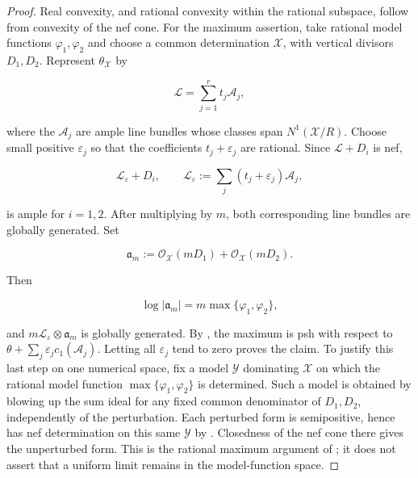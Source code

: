 \begin{proof}
Real convexity, and rational convexity within the rational subspace,
follow from convexity of the nef cone.  For the maximum assertion, take
rational model functions
$\varphi_1,\varphi_2$ and choose a common determination
$\mathcal X$, with vertical divisors $D_1,D_2$.  Represent
$\theta_{\mathcal X}$ by

\begin{equation}
\label{eq:ch20-ample-basis}
                    \mathcal L=\sum_{j=1}^r t_j\mathcal A_j,
\end{equation}

where the $\mathcal A_j$ are ample line bundles whose classes span
$N^1(\mathcal X/R)$.  Choose small positive $\varepsilon_j$ so that
the coefficients $t_j+\varepsilon_j$ are rational.  Since
$\mathcal L+D_i$ is nef,

\begin{equation}
\label{eq:ch20-ample-perturbation}
              \mathcal L_\varepsilon+D_i,
              \qquad
              \mathcal L_\varepsilon
                :=\sum_j(t_j+\varepsilon_j)\mathcal A_j,
\end{equation}

is ample for $i=1,2$.  After multiplying by $m$, both corresponding
line bundles are globally generated.  Set

\begin{equation}
\label{eq:ch20-max-ideal}
 \mathfrak a_m
   :=\mathcal O_{\mathcal X}(mD_1)
       +\mathcal O_{\mathcal X}(mD_2).
\end{equation}

Then

\begin{equation}
\label{eq:ch20-max-ideal-function}
             \log|\mathfrak a_m|
                  =m\max\{\varphi_1,\varphi_2\},
\end{equation}

and $m\mathcal L_\varepsilon\otimes\mathfrak a_m$ is globally
generated.  By , the maximum is psh with
respect to
$\theta+\sum_j\varepsilon_jc_1(\mathcal A_j)$.  Letting all
$\varepsilon_j$ tend to zero proves the claim.  To justify this last step
on one numerical space, fix a model $\mathcal Y$ dominating
$\mathcal X$ on which the rational model function
$\max\{\varphi_1,\varphi_2\}$ is determined.  Such a model is obtained
by blowing up the sum ideal for any fixed common denominator of
$D_1,D_2$, independently of the perturbation.  Each perturbed form is
semipositive, hence has nef determination on this same $\mathcal Y$ by
.  Closedness of the nef cone
there gives the unperturbed form.  This is the rational maximum argument of
\cite[Proposition~5.8]{BFJ16}; it does not assert that a uniform limit
remains in the model-function space.
\end{proof}


